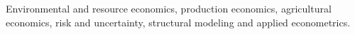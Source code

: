 Environmental and resource economics, production economics, agricultural economics, risk and uncertainty, structural modeling and applied econometrics.